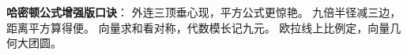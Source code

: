 \begin{summarybox}
\textbf{哈密顿公式增强版口诀}：
外连三顶垂心现，平方公式更惊艳。
九倍半径减三边，距离平方算得便。
向量求和看对称，代数模长记九元。
欧拉线上比例定，向量几何大团圆。
\end{summarybox}